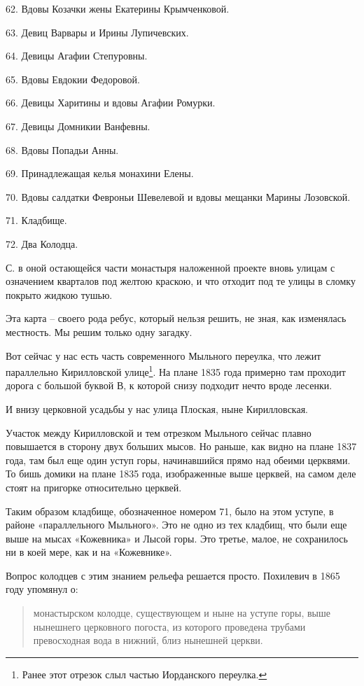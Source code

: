 62. Вдовы Козачки жены Екатерины Крымченковой.

63. Девиц Варвары и Ирины Лупичевских.

64. Девицы Агафии Степуровны.

65. Вдовы Евдокии Федоровой.

66. Девицы Харитины и вдовы Агафии Ромурки.

67. Девицы Домникии Ванфевны.

68. Вдовы Попадьи Анны.

69. Принадлежащая келья монахини Елены.

70. Вдовы салдатки Февроньи Шевелевой и вдовы мещанки Марины Лозовской.

71. Кладбище.

72. Два Колодца.

С. в оной остающейся части монастыря наложенной проекте вновь улицам с означением кварталов под желтою краскою, и что отходит под те улицы в сломку покрыто жидкою тушью.

Эта карта – своего рода ребус, который нельзя решить, не зная, как изменялась местность. Мы решим только одну загадку.

Вот сейчас у нас есть часть современного Мыльного переулка, что лежит параллельно Кирилловской улице\footnote{Ранее этот отрезок слыл частью Иорданского переулка.}. На плане 1835 года примерно там проходит дорога с большой буквой В, к которой снизу подходит нечто вроде лесенки.

И внизу церковной усадьбы у нас улица Плоская, ныне Кирилловская.

Участок между Кирилловской и тем отрезком Мыльного сейчас плавно повышается в сторону двух больших мысов. Но раньше, как видно на плане 1837 года, там был еще один уступ горы, начинавшийся прямо над обеими церквями. То бишь домики на плане 1835 года, изображенные выше церквей, на самом деле стоят на пригорке относительно церквей.

Таким образом кладбище, обозначенное номером 71, было на этом уступе, в районе «параллельного Мыльного». Это не одно из тех кладбищ, что были еще выше на мысах «Кожевника» и Лысой горы. Это третье, малое, не сохранилось ни в коей мере, как и на «Кожевнике».

Вопрос колодцев с этим знанием рельефа решается просто. Похилевич в 1865 году упомянул о:

\begin{quotation}
монастырском колодце, существующем и ныне на уступе горы, выше нынешнего церковного погоста, из которого проведена трубами превосходная вода в нижний, близ нынешней церкви.
\end{quotation}

